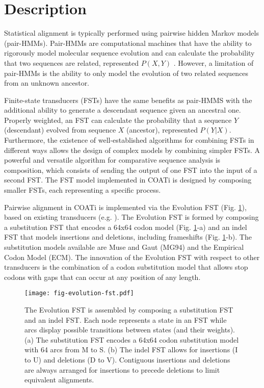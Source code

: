\section{Description}

Statistical alignment is typically performed using pairwise hidden Markov models
(pair-HMMs).
Pair-HMMs are computational machines that have the ability to rigorously model
molecular sequence evolution and can calculate the probability that two
sequences are related, represented $P(X, Y)$ \parencite{yoon_2009_hmm}.
However, a limitation of pair-HMMs is the ability to only model the evolution
of two related sequences from an unknown ancestor.

Finite-state transducers (FSTs) have the same benefits as pair-HMMS with the
additional ability to generate a descendant sequence given an ancestral one.
Properly weighted, an FST can calculate the probability that a sequence $Y$
(descendant) evolved from sequence $X$ (ancestor), represented $P(Y | X)$.
Furthermore, the existence of well-established algorithms for combining FSTs in
different ways \parencite{bradley2007transducers} allows the design of complex
models by combining simpler FSTs.
A powerful and versatile algorithm for comparative sequence analysis is
composition, which consists of sending the output of one FST into the input of a
second FST.
The FST model implemented in COATi is designed by composing smaller FSTs, each
representing a specific process.

Pairwise alignment in COATi is implemented via the Evolution FST (Fig.
\ref{fig:evolution-fst}), based on existing transducers (e.g.
\cite{holmes2001evolutionary}).
The Evolution FST is formed by composing a substitution FST that encodes a 64x64
codon model (Fig. \ref{fig:evolution-fst}-a) and an indel FST that models
insertions and deletions, including frameshifts (Fig. \ref{fig:evolution-fst}-b).
The substitution models available are Muse and Gaut \parencite{muse_gaut_1994}
(MG94) and the Empirical Codon Model \parencite{kosiol_ECM_2007} (ECM).
The innovation of the Evolution FST with respect to other transducers is the
combination of a codon substitution model that allows stop codons with gaps that
can occur at any position of any length.

\begin{figure}[h!]
\begin{framed}
\centering
    \texttt{[image: fig-evolution-fst.pdf]}
    \caption{The Evolution FST is assembled by composing a substitution FST and
    an indel FST. Each node represents a state in an FST while arcs display
    possible transitions between states (and their weights). (a) The
    substitution FST encodes a 64x64 codon substitution model with 64 arcs from
    M to S. (b) The indel FST allows for insertions (I to U) and deletions
    (D to V). Contiguous insertions and deletions are always arranged for
    insertions to precede deletions to limit equivalent alignments.}
    \label{fig:evolution-fst}
\end{framed}
\end{figure}


